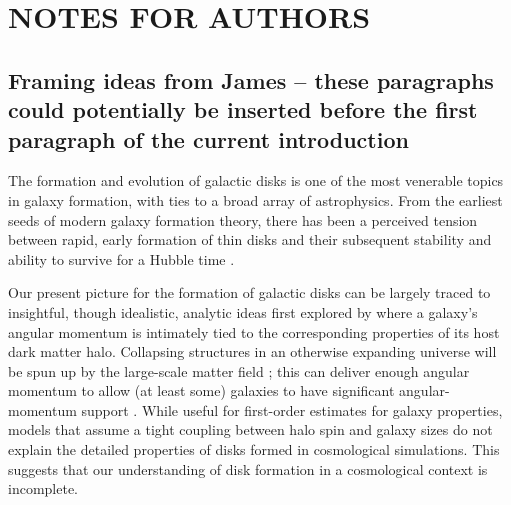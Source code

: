 \documentclass[fleqn,usenatbib]{mnras}
\begin{document}


\section{NOTES FOR AUTHORS}

\subsection{Framing ideas from James -- these paragraphs could potentially be inserted before the first paragraph of the current introduction}
The formation and evolution of galactic disks is one of the most venerable topics in galaxy formation, with ties to a broad array of astrophysics. From the earliest seeds of modern galaxy formation theory, there has been a perceived tension between rapid, early formation of thin disks \citep{eggen1962} and their subsequent stability and ability to survive for a Hubble time \citep{ostriker1973,toth1992}. 

Our present picture for the formation of galactic disks  can be largely traced to insightful, though idealistic, analytic ideas first explored by \citet{fall1980}
where a galaxy's angular momentum is intimately tied to the corresponding properties of its host dark matter halo.  Collapsing structures in an otherwise expanding universe will be spun up by the large-scale matter field \citep{Peebles69};  this can deliver enough angular momentum to allow (at least some) galaxies to have significant angular-momentum support \citep[e.g.][]{MMW98}. While useful for first-order estimates for galaxy properties, models that assume a tight coupling between halo spin and galaxy sizes do not explain the detailed properties of disks formed in cosmological simulations\citep[e.g.][]{GK18}.  This suggests that our understanding of disk formation in a cosmological context is incomplete. 
\end{document}
